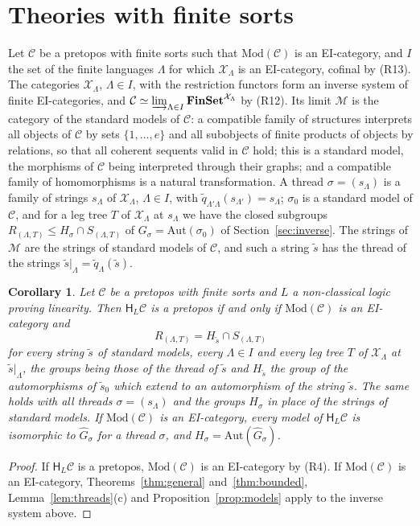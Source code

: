 \documentclass[11pt]{amsart}
\newtheorem{cor}[thm]{Corollary}
\theoremstyle{definition}
\newcommand{\Fin}{\mathbf{FinSet}}
\newcommand{\Mod}{\mathrm{Mod}}
\newcommand{\Aut}{\mathrm{Aut}}
\newcommand{\HH}{\mathsf H}
\newcommand{\cX}{\mathcal X}
\newcommand{\cC}{\mathcal C}
\newcommand{\cM}{\mathcal M}
\begin{document}
\section{Theories with finite sorts}\label{sec:theories}

Let $\cC$ be a pretopos with finite sorts such that $\Mod(\cC)$ is an
EI-category, and $I$ the set of the finite languages $\Lambda$ for
which $\cX_\Lambda$ is an EI-category, cofinal by (R13). The
categories $\cX_\Lambda$, $\Lambda\in I$, with the restriction
functors form an inverse system of finite EI-categories, and
$\cC\simeq\varinjlim_{\Lambda\in I}\Fin^{\cX_\Lambda}$ by (R12). Its
limit $\cM$ is the category of the standard models of $\cC$: a
compatible family of structures interprets all objects of $\cC$ by
sets $\{1,\dots,e\}$ and all subobjects of finite products of objects
by relations, so that all coherent sequents valid in $\cC$ hold; this
is a standard model, the morphisms of $\cC$ being interpreted through
their graphs; and a compatible family of homomorphisms is a natural
transformation. A thread $\sigma=(s_\Lambda)$ is a family of strings
$s_\Lambda$ of $\cX_\Lambda$, $\Lambda\in I$, with $\tilde
q_{\Lambda'\Lambda}(s_{\Lambda'})=s_\Lambda$; $\sigma_0$ is a standard
model of $\cC$, and for a leg tree $T$ of $\cX_\Lambda$ at $s_\Lambda$
we have the closed subgroups $R_{(\Lambda,T)}\le H_\sigma\cap
S_{(\Lambda,T)}$ of $G_\sigma=\Aut(\sigma_0)$ of
Section~\ref{sec:inverse}. The strings of $\cM$ are the strings of
standard models of $\cC$, and such a string $\tilde s$ has the thread
of the strings $\tilde s|_\Lambda=\tilde q_\Lambda(\tilde s)$.

\begin{cor}\label{cor:final}
Let $\cC$ be a pretopos with finite sorts and $L$ a non-classical
logic proving linearity. Then $\HH_L\cC$ is a pretopos if and only if
$\Mod(\cC)$ is an EI-category and
\[
R_{(\Lambda,T)}=H_{\tilde s}\cap S_{(\Lambda,T)}
\]
for every string $\tilde s$ of standard models, every $\Lambda\in I$
and every leg tree $T$ of $\cX_\Lambda$ at $\tilde s|_\Lambda$, the
groups being those of the thread of $\tilde s$ and $H_{\tilde s}$ the
group of the automorphisms of $\tilde s_0$ which extend to an
automorphism of the string $\tilde s$. The same holds with all
threads $\sigma=(s_\Lambda)$ and the groups $H_\sigma$ in place of the
strings of standard models. If $\Mod(\cC)$ is an EI-category, every
model of $\HH_L\cC$ is isomorphic to $\hat G_\sigma$ for a thread
$\sigma$, and $H_\sigma=\Aut(\hat G_\sigma)$.
\end{cor}
\begin{proof}
If $\HH_L\cC$ is a pretopos, $\Mod(\cC)$ is an EI-category by (R4). If
$\Mod(\cC)$ is an EI-category, Theorems~\ref{thm:general}
and~\ref{thm:bounded}, Lemma~\ref{lem:threads}(c) and
Proposition~\ref{prop:models} apply to the inverse system above.
\end{proof}
\end{document}
